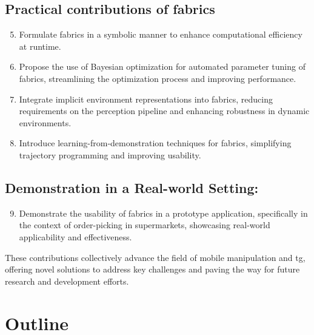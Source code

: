 \subsection{Practical contributions of \ac{fabrics}}
\begin{enumerate}
    \setcounter{enumi}{4}
    \item Formulate \ac{fabrics} in a symbolic
      manner to enhance computational efficiency at runtime.
    \item Propose the use of Bayesian optimization for
      automated parameter tuning of \ac{fabrics},
      streamlining the optimization process and improving
      performance.
    \item Integrate implicit environment representations
      into \ac{fabrics}, reducing requirements on
      the perception pipeline and enhancing robustness in
      dynamic environments.
    \item Introduce learning-from-demonstration techniques
      for \ac{fabrics}, simplifying trajectory
      programming and improving usability.
\end{enumerate}

\subsection{Demonstration in a Real-world Setting:}
\begin{enumerate}
    \setcounter{enumi}{8}
    \item Demonstrate the usability of \ac{fabrics}
      in a prototype application, specifically in the
      context of order-picking in supermarkets, showcasing
      real-world applicability and effectiveness.
\end{enumerate}

These contributions collectively advance the field of mobile
manipulation and \ac{tg}, offering novel
solutions to address key challenges and paving the way for
future research and development efforts.





\section{Outline}

